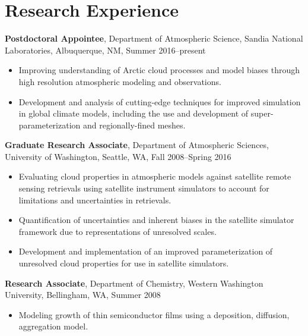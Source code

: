 \documentclass[10pt]{article}
\newenvironment{itemize*}{
   \begin{list}{}
      { 
         \setlength{\itemsep}{5pt}
         \setlength{\parsep}{0pt}
         \setlength{\topsep}{0pt}
         \setlength{\leftmargin}{0em} 
      } 
} {
   \end{list}
}
\begin{document}
\section*{Research Experience}
\begin{itemize*}
\item \textbf{Postdoctoral Appointee},
    Department of Atmospheric Science,
    Sandia National Laboratories, Albuquerque, NM,
    Summer 2016--present
    \begin{itemize}
    \item Improving understanding of Arctic cloud processes and model biases through high resolution atmospheric modeling and observations. 
    \item Development and analysis of cutting-edge techniques for improved simulation in global climate models, including the use and development of super-parameterization and regionally-fined meshes. 
    \end{itemize}
\item \textbf{Graduate Research Associate}, 
    Department of Atmospheric Sciences,
    University of Washington, Seattle, WA,
    Fall 2008--Spring 2016 
    \begin{itemize}
    \item Evaluating cloud properties in atmospheric models against satellite remote sensing retrievals using satellite instrument simulators to account for limitations and uncertainties in retrievals. 
    \item Quantification of uncertainties and inherent biases in the satellite simulator framework due to representations of unresolved scales. 
    \item Development and implementation of an improved parameterization of unresolved cloud properties for use in satellite simulators.
   \end{itemize}
\item \textbf{Research Associate},
   Department of Chemistry,
   Western Washington University, Bellingham, WA,
   Summer 2008 
   \begin{itemize}
   \item Modeling growth of thin semiconductor films using a deposition, diffusion, aggregation model.
   \end{itemize}
\end{itemize*}
\end{document}
